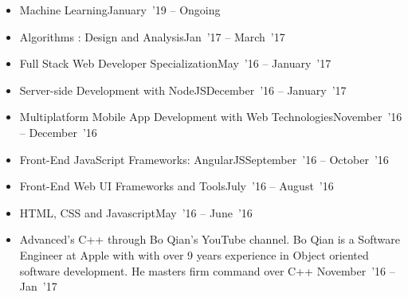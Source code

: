 \documentclass[10pt,a4paper]{article}
\begin{document}
\vspace{0.15cm}
\begin{itemize}[labelindent=1.5em,labelsep=-0.3cm,leftmargin=*]

\item \headedsubsection 
    {Machine Learning}{{{January~'19 -- Ongoing}}}
    {}

\item \headedsubsection 
    {Algorithms : Design and Analysis}{{{Jan~'17 -- March~'17}}}
    {}
    
\item \headedsubsection 
    {Full Stack Web Developer Specialization}{{{May~'16 -- January~'17}}}
    {}
    
\item \headedsubsection 
    {Server-side Development with NodeJS}{{{December~'16 -- January~'17}}}
    {}

\item \headedsubsection 
    {Multiplatform Mobile App Development with Web Technologies}{{{November~'16 -- December~'16}}}
    {}
    
\item \headedsubsection 
    {Front-End JavaScript Frameworks: AngularJS}{{{September~'16 -- October~'16}}}
    {}
    
\item \headedsubsection 
    {Front-End Web UI Frameworks and Tools}{{{July~'16 -- August~'16}}}
    {}
    

\item \headedsubsection 
    {HTML, CSS and Javascript}{{{May~'16 -- June~'16}}}
    {}
    

\item \headedsubsection  %
  {{\normalfont Advanced's C++ through Bo Qian's YouTube channel. Bo Qian is a Software Engineer at Apple with with over 9 years experience in Object oriented software development. He masters firm command over C++ }}{{{November~'16 -- Jan~'17}}}
  
\end{itemize}
\end{document}
